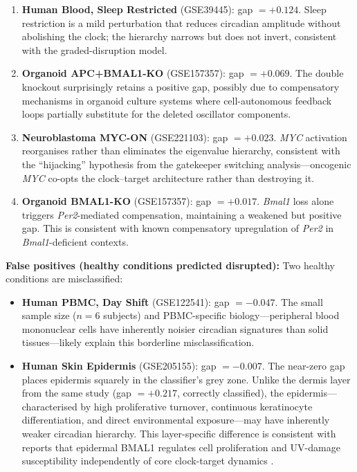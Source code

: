 \documentclass[11pt,a4paper]{article}
\begin{document}
\begin{enumerate}
    \item \textbf{Human Blood, Sleep Restricted} (GSE39445): gap $= +0.124$. Sleep restriction is a mild perturbation that reduces circadian amplitude without abolishing the clock; the hierarchy narrows but does not invert, consistent with the graded-disruption model.
    \item \textbf{Organoid APC+BMAL1-KO} (GSE157357): gap $= +0.069$. The double knockout surprisingly retains a positive gap, possibly due to compensatory mechanisms in organoid culture systems where cell-autonomous feedback loops partially substitute for the deleted oscillator components.
    \item \textbf{Neuroblastoma MYC-ON} (GSE221103): gap $= +0.023$. \textit{MYC} activation reorganises rather than eliminates the eigenvalue hierarchy, consistent with the ``hijacking'' hypothesis from the gatekeeper switching analysis---oncogenic \textit{MYC} co-opts the clock--target architecture rather than destroying it.
    \item \textbf{Organoid BMAL1-KO} (GSE157357): gap $= +0.017$. \textit{Bmal1} loss alone triggers \textit{Per2}-mediated compensation, maintaining a weakened but positive gap. This is consistent with known compensatory upregulation of \textit{Per2} in \textit{Bmal1}-deficient contexts.
\end{enumerate}

\textbf{False positives (healthy conditions predicted disrupted):} Two healthy conditions are misclassified:

\begin{itemize}
    \item \textbf{Human PBMC, Day Shift} (GSE122541): gap $= -0.047$. The small sample size ($n = 6$ subjects) and PBMC-specific biology---peripheral blood mononuclear cells have inherently noisier circadian signatures than solid tissues---likely explain this borderline misclassification.
    \item \textbf{Human Skin Epidermis} (GSE205155): gap $= -0.007$. The near-zero gap places epidermis squarely in the classifier's grey zone. Unlike the dermis layer from the same study (gap $= +0.217$, correctly classified), the epidermis---characterised by high proliferative turnover, continuous keratinocyte differentiation, and direct environmental exposure---may have inherently weaker circadian hierarchy. This layer-specific difference is consistent with reports that epidermal BMAL1 regulates cell proliferation and UV-damage susceptibility independently of core clock-target dynamics \citep{geyfman2012bmal1}.
\end{itemize}
\end{document}
